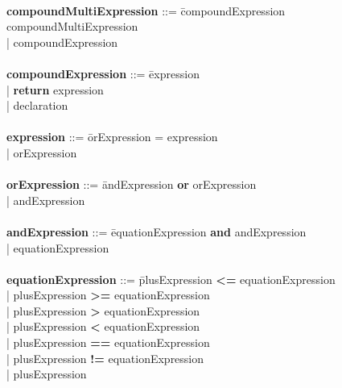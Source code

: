\begin{tabbing}
\\ 
{\bf compoundMultiExpression}     ::= \=compoundExpression compoundMultiExpression\\
                                      \>| compoundExpression\\
\\
{\bf compoundExpression}          ::= \=expression\\
                                      \>| \textbf{return} expression\\
                                      \>| declaration\\
\\ 
{\bf expression}                  ::= \=orExpression = expression\\
                                      \>| orExpression\\
\\   
{\bf orExpression}                ::= \=andExpression \textbf{or} orExpression\\
                                      \>| andExpression\\
\\   
{\bf andExpression}               ::= \=equationExpression \textbf{and} andExpression\\
                                      \>| equationExpression\\
\\ 
{\bf equationExpression}          ::= \=plusExpression \textbf{\textless{}=} equationExpression\\
                                      \>| plusExpression \textbf{\textgreater{}=} equationExpression\\
                                      \>| plusExpression \textbf{\textgreater{}} equationExpression\\
                                      \>| plusExpression \textbf{\textless{}} equationExpression\\
                                      \>| plusExpression \textbf{==} equationExpression\\
                                      \>| plusExpression \textbf{!=} equationExpression\\
                                      \>| plusExpression\\


\end{tabbing}

